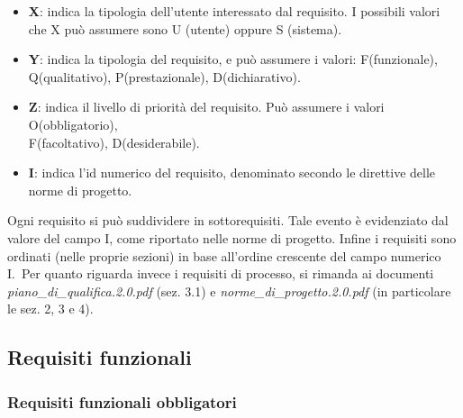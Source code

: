 		\begin{itemize}

			\item \textbf{X}: indica la tipologia dell'utente interessato dal requisito. I possibili valori che X può assumere sono U (utente) oppure S (sistema).

			\item \textbf{Y}: indica la tipologia del requisito, e può assumere i valori: F(funzionale), Q(qualitativo), P(prestazionale), D(dichiarativo).

			\item \textbf{Z}: indica il livello di priorità del requisito. Può assumere i valori O(obbligatorio), \\F(facoltativo), D(desiderabile).

			\item \textbf{I}: indica l'id numerico del requisito, denominato secondo le direttive delle norme di progetto.

		\end{itemize}


		Ogni requisito si può suddividere in sottorequisiti. Tale evento è evidenziato dal valore del campo I, come riportato nelle norme di progetto. Infine i requisiti sono ordinati (nelle proprie sezioni) in base all'ordine crescente del campo numerico I.\
Per quanto riguarda invece i requisiti di processo, si rimanda ai documenti \textit{piano\_di\_qualifica.2.0.pdf} (sez. 3.1) e \textit{norme\_di\_progetto.2.0.pdf} (in particolare le sez. 2, 3 e 4).

\subsection{Requisiti funzionali}


\subsubsection{Requisiti funzionali obbligatori}

